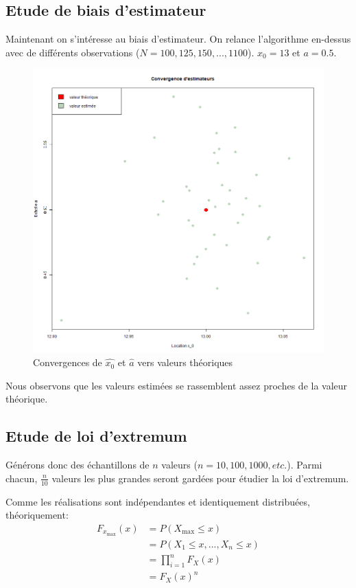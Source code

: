 \documentclass[12pt,a4paper,titlepage]{article}
\numberwithin{equation}{section}
\begin{document}
\subsection{Etude de biais d'estimateur}

Maintenant on s'intéresse au biais d'estimateur. On relance l'algorithme en-dessus avec de différents observations ($N = 100, 125, 150,..., 1100$). $x_0 = 13$ et $a = 0.5$.



\begin{figure}[!h]
\includegraphics[width=\linewidth]{images/Cauchy_convergence_parametres.png}
\caption{Convergences de $\hat{x_0}$ et $\hat{a}$ vers valeurs théoriques}
\end{figure}

Nous observons que les valeurs estimées se rassemblent assez proches de la valeur théorique.
\clearpage
\subsection{Etude de loi d'extremum}

Générons donc des échantillons de $n$ valeurs ($n=10, 100, 1000, etc.$). Parmi chacun, $\frac{n}{10}$ valeurs les plus grandes seront gardées pour étudier la loi d'extremum.

Comme les réalisations sont indépendantes et identiquement distribuées, théoriquement:
\begin{align*}
{F_{{x_{\max }}}}\left( x \right) & = P\left( {{X_{\max }} \le x} \right)\\
&  = P\left( {{X_1} \le x,...,{X_n} \le x} \right)\\
 & = \prod\limits_{i = 1}^n {{F_X}\left( x \right)} \\
 & = {F_X}{\left( x \right)^n}
\end{align*}
\end{document}
